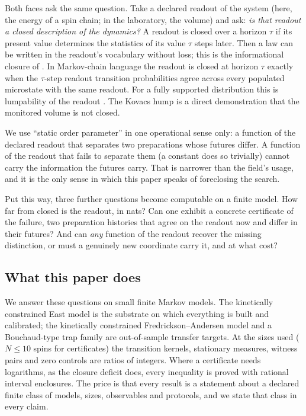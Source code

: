 Both faces ask the same question. Take a declared readout of the system (here, the energy of a
spin chain; in the laboratory, the volume) and ask: \emph{is that readout a closed description of
the dynamics?} A readout is closed over a horizon $\tau$ if its present value determines the
statistics of its value $\tau$ steps later. Then a law can be written in the readout's vocabulary
without loss; this is the informational closure of \cite{bertschinger-2006,pfante-2014}. In
Markov-chain language the readout is closed at horizon $\tau$ exactly when the $\tau$-step
readout transition probabilities agree across every populated microstate with the same readout.
For a fully supported distribution this is lumpability of the readout
\cite{burke-rosenblatt-1958,kemeny-snell-1960}. The Kovacs hump is a direct demonstration that the
monitored volume is not closed.

We use ``static order parameter'' in one operational sense only: a function of the declared
readout that separates two preparations whose futures differ. A function of the readout that
fails to separate them (a constant does so trivially) cannot carry the information the futures
carry. That is narrower than the field's usage, and it is the only sense in which this paper
speaks of foreclosing the search.

Put this way, three further questions become computable on a finite model. How far from closed is
the readout, in nats? Can one exhibit a concrete certificate of the failure, two preparation
histories that agree on the readout now and differ in their futures? And can \emph{any} function
of the readout recover the missing distinction, or must a genuinely new coordinate carry it, and
at what cost?

\subsection{What this paper does}

We answer these questions on small finite Markov models. The kinetically constrained East model
\cite{jackle-eisinger-1991,ritort-sollich-2003,garrahan-sollich-toninelli-2011} is the substrate
on which everything is built and calibrated; the kinetically constrained Fredrickson--Andersen
model \cite{fredrickson-andersen-1984} and a Bouchaud-type trap family
\cite{bouchaud-1992,monthus-bouchaud-1996} are out-of-sample transfer targets. At the sizes used
($N \le 10$ spins for certificates) the transition kernels, stationary measures, witness pairs
and zero controls are ratios of integers. Where a certificate needs logarithms, as the closure
deficit does, every inequality is proved with rational interval enclosures. The price is
that every result is a statement about a declared finite class of models, sizes, observables and
protocols, and we state that class in every claim.

